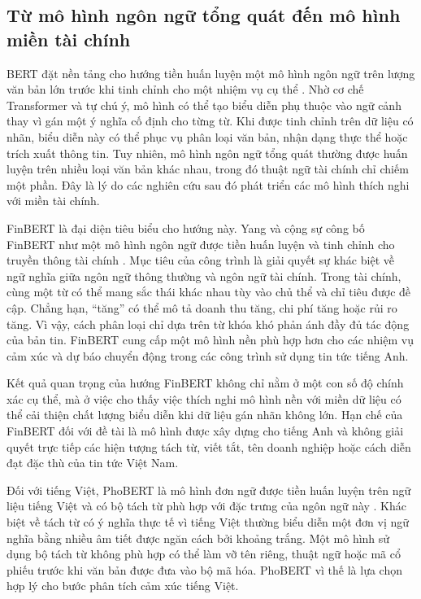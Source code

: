 \subsection{Từ mô hình ngôn ngữ tổng quát đến mô hình miền tài chính}

BERT đặt nền tảng cho hướng tiền huấn luyện một mô hình ngôn ngữ trên lượng văn bản
lớn trước khi tinh chỉnh cho một nhiệm vụ cụ thể \cite{Devlin2019_bert}. Nhờ cơ chế Transformer và tự chú ý,
mô hình có thể tạo biểu diễn phụ thuộc vào ngữ cảnh thay vì gán một ý nghĩa
cố định cho từng từ. Khi được tinh chỉnh trên dữ liệu có nhãn, biểu diễn này có thể
phục vụ phân loại văn bản, nhận dạng thực thể hoặc trích xuất thông tin. Tuy nhiên,
mô hình ngôn ngữ tổng quát thường được huấn luyện trên nhiều loại văn bản khác nhau,
trong đó thuật ngữ tài chính chỉ chiếm một phần. Đây là lý do các nghiên cứu sau đó
phát triển các mô hình thích nghi với miền tài chính.

FinBERT là đại diện tiêu biểu cho hướng này. Yang và cộng sự công bố FinBERT như một
mô hình ngôn ngữ được tiền huấn luyện và tinh chỉnh cho truyền thông tài chính
\cite{Yang2020_200608097v2}. Mục tiêu của công trình là giải quyết sự khác biệt về
ngữ nghĩa giữa ngôn ngữ thông thường và ngôn ngữ tài chính. Trong tài chính, cùng một
từ có thể mang sắc thái khác nhau tùy vào chủ thể và chỉ tiêu được đề cập. Chẳng hạn,
``tăng'' có thể mô tả doanh thu tăng, chi phí tăng hoặc rủi ro tăng. Vì vậy, cách phân
loại chỉ dựa trên từ khóa khó phản ánh đầy đủ tác động của bản tin. FinBERT cung cấp
một mô hình nền phù hợp hơn cho các nhiệm vụ cảm xúc và dự báo chuyển động trong các
công trình sử dụng tin tức tiếng Anh.

Kết quả quan trọng của hướng FinBERT không chỉ nằm ở một con số độ chính xác cụ thể, mà
ở việc cho thấy việc thích nghi mô hình nền với miền dữ liệu có thể cải thiện chất lượng
biểu diễn khi dữ liệu gán nhãn không lớn. Hạn chế của FinBERT đối với đề tài là mô hình
được xây dựng cho tiếng Anh và không giải quyết trực tiếp các hiện tượng tách từ,
viết tắt, tên doanh nghiệp hoặc cách diễn đạt đặc thù của tin tức Việt Nam.

Đối với tiếng Việt, PhoBERT là mô hình đơn ngữ được tiền huấn luyện trên ngữ liệu tiếng
Việt và có bộ tách từ phù hợp với đặc trưng của ngôn ngữ này \cite{Nguyen2020_200300744v3}.
Khác biệt về tách từ có ý nghĩa thực tế vì tiếng Việt thường biểu diễn một đơn vị ngữ
nghĩa bằng nhiều âm tiết được ngăn cách bởi khoảng trắng. Một mô hình sử dụng bộ tách từ
không phù hợp có thể làm vỡ tên riêng, thuật ngữ hoặc mã cổ phiếu trước khi văn bản
được đưa vào bộ mã hóa. PhoBERT vì thế là lựa chọn hợp lý cho bước phân tích cảm xúc
tiếng Việt.

